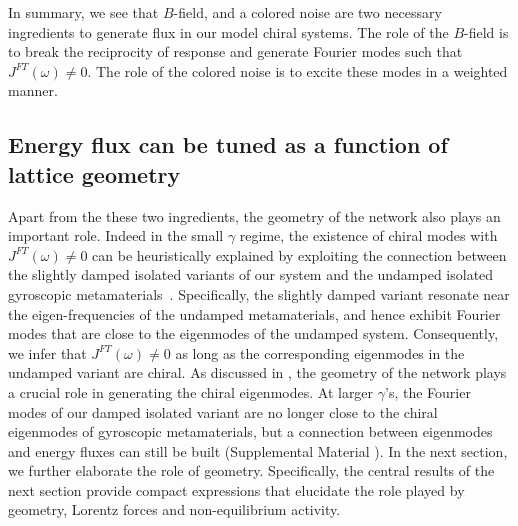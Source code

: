 \documentclass[
 preprint,
 preprintnumbers,
 amsmath,amssymb,
 aps,
 pre,
 longbibliography,
 superscriptaddress,
 10pt, twocolumn
]{revtex4-1}
\begin{document}
In summary, we see that $B$-field, and a colored noise are two necessary ingredients to generate flux in our model chiral systems.
The role of the $B$-field is to break the reciprocity of response and generate Fourier modes such that $J^{FT}(\omega)\neq 0$. The role of the colored noise is to excite these modes in a weighted manner.

\subsection{Energy flux can be tuned as a function of lattice geometry} 
Apart from the these two ingredients, the geometry of the network also plays an important role.
Indeed in the small $\gamma$ regime, the existence of chiral modes with $J^{FT}(\omega)\neq 0$ can be heuristically explained by exploiting the connection between the slightly damped isolated variants of our system and the undamped isolated gyroscopic metamaterials~\cite{Nash2015TopologicalMechanics,Mitchell2018AmorphousTopological}.
Specifically, the slightly damped variant resonate near the eigen-frequencies of the undamped metamaterials, and hence exhibit Fourier modes that are close to the eigenmodes of the undamped system. Consequently, we infer that $J^{FT}(\omega)\neq 0$ as long as the corresponding eigenmodes in the undamped variant are chiral. As discussed in  \cite{Nash2015TopologicalMechanics}, the geometry of the network plays a crucial role in generating the chiral eigenmodes.
At larger $\gamma$'s, the Fourier modes of our damped isolated variant are no longer close to the chiral eigenmodes of gyroscopic metamaterials, but a connection between eigenmodes and energy fluxes can still be built (Supplemental Material \cite{SupplementalMaterial}).
In the next section, we further elaborate the role of geometry. Specifically, the central results of the next section provide compact expressions that elucidate the role played by geometry, Lorentz forces and non-equilibrium activity.
\end{document}
